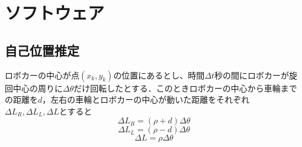 
\section{ソフトウェア}
  \subsection{自己位置推定}
  ロボカーの中心が点$(x_k,y_k)$の位置にあるとし、時間$\Delta t$秒の間にロボカーが旋回中心の周りに$\Delta \theta$だけ回転したとする．このときロボカーの中心から車輪までの距離を$d$，左右の車輪とロボカーの中心が動いた距離をそれぞれ$\Delta L_R, \Delta L_L, \Delta L$とすると
\begin{equation}
   \Delta L_R = (\rho + d) \Delta \theta \nonumber
\end{equation}
\begin{equation}
  \Delta L_L  =  (\rho - d) \Delta \theta \nonumber
\end{equation}
\begin{equation}
   \Delta L  = \rho \Delta \theta
\end{equation}
 

